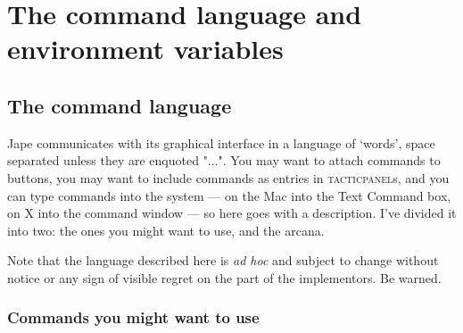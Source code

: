 \chapter{The command language and environment variables}
\label{appx:GUIlang}


\section{The command language}


Jape communicates with its graphical interface in a language of `words', space separated unless they are enquoted "...". You may want to attach commands to buttons, you may want to include commands as entries in \textsc{tacticpanel}s, and you can type commands into the system --- on the Mac into the Text Command box, on X into the command window --- so here goes with a description. I've divided it into two: the ones you might want to use, and the arcana.


Note that the language described here is \textit{ad hoc} and subject to change without notice or any sign of visible regret on the part of the implementors. Be warned.


\subsection{Commands you might want to use}


